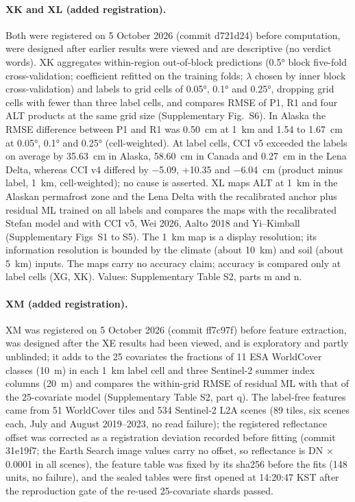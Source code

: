 \paragraph*{XK and XL (added registration).} Both were registered on 5 October 2026 (commit d721d24) before computation, were designed after earlier results were viewed and are descriptive (no verdict words). XK aggregates within-region out-of-block predictions (0.5° block five-fold cross-validation; coefficient refitted on the training folds; $\lambda$ chosen by inner block cross-validation) and labels to grid cells of 0.05°, 0.1° and 0.25°, dropping grid cells with fewer than three label cells, and compares RMSE of P1, R1 and four ALT products at the same grid size (Supplementary Fig.~S6). In Alaska the RMSE difference between P1 and R1 was 0.50~cm at 1~km and 1.54 to 1.67~cm at 0.05°, 0.1° and 0.25° (cell-weighted). At label cells, CCI v5 exceeded the labels on average by 35.63~cm in Alaska, 58.60~cm in Canada and 0.27~cm in the Lena Delta, whereas CCI v4 differed by $-$5.09, +10.35 and $-$6.04~cm (product minus label, 1~km, cell-weighted); no cause is asserted. XL maps ALT at 1~km in the Alaskan permafrost zone and the Lena Delta with the recalibrated anchor plus residual ML trained on all labels and compares the maps with the recalibrated Stefan model and with CCI v5, Wei 2026, Aalto 2018 and Yi--Kimball (Supplementary Figs~S1 to S5). The 1~km map is a display resolution; its information resolution is bounded by the climate (about 10~km) and soil (about 5~km) inputs. The maps carry no accuracy claim; accuracy is compared only at label cells (XG, XK). Values: Supplementary Table S2, parts m and n.

\paragraph*{XM (added registration).} XM was registered on 5 October 2026 (commit ff7c97f) before feature extraction, was designed after the XE results had been viewed, and is exploratory and partly unblinded; it adds to the 25 covariates the fractions of 11 ESA WorldCover classes (10~m) in each 1~km label cell and three Sentinel-2 summer index columns (20~m) and compares the within-grid RMSE of residual ML with that of the 25-covariate model (Supplementary Table S2, part q). The label-free features came from 51 WorldCover tiles and 534 Sentinel-2 L2A scenes (89 tiles, six scenes each, July and August 2019--2023, no read failure); the registered reflectance offset was corrected as a registration deviation recorded before fitting (commit 31e19f7; the Earth Search image values carry no offset, so reflectance is DN $\times$ 0.0001 in all scenes), the feature table was fixed by its sha256 before the fits (148 units, no failure), and the sealed tables were first opened at 14:20:47 KST after the reproduction gate of the re-used 25-covariate shards passed.

